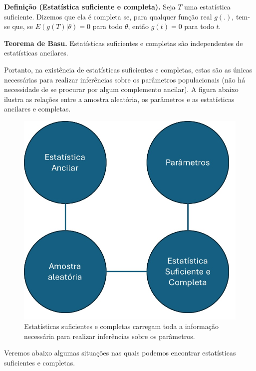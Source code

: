 \documentclass[
  letterpaper,
  DIV=11,
  numbers=noendperiod]{scrartcl}
\begin{document}
\textbf{Definição (Estatística suficiente e completa).} Seja \(T\) uma
estatística suficiente. Dizemos que ela é completa se, para qualquer
função real \(g(.)\), tem-se que, se \(E(g(T)|\theta)=0\) para todo
\(\theta\), então \(g(t)=0\) para todo \(t\).

\textbf{Teorema de Basu.} Estatísticas suficientes e completas são
independentes de estatísticas ancilares.

Portanto, na existência de estatísticas suficientes e completas, estas
são as únicas necessárias para realizar inferências sobre os parâmetros
populacionais (não há necessidade de se procurar por algum complemento
ancilar). A figura abaixo ilustra as relações entre a amostra aleatória,
os parâmetros e as estatísticas ancilares e completas.

\begin{figure}

{\centering \includegraphics{fig_stat_completa_ancilar.jpg}

}

\caption{Estatísticas suficientes e completas carregam toda a informação
necessária para realizar inferências sobre os parâmetros.}

\end{figure}%

Veremos abaixo algumas situações nas quais podemos encontrar
estatísticas suficientes e completas.
\end{document}
